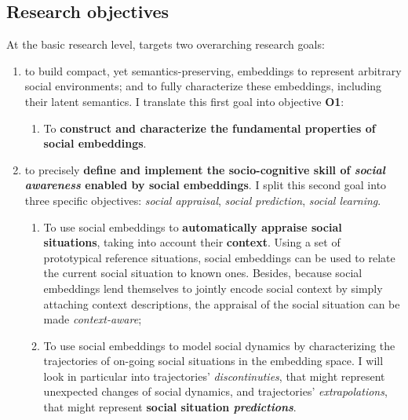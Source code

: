 \subsection{Research objectives}


At the basic research level, \project targets two overarching research goals:

\begin{enumerate}[label=\textbf{(\arabic*)}]
    \item to build compact, yet semantics-preserving, embeddings to represent
arbitrary social environments; and to fully characterize these embeddings,
including their latent semantics. I translate this first goal into objective
{\bf O1}:

\begin{enumerate}[label=\textbf{O\arabic*}]
    \item \label{O1} To \textbf{construct and characterize the fundamental
properties of social embeddings}.
\end{enumerate}

    \item to precisely \textbf{define and implement the socio-cognitive skill of
        \emph{social awareness} enabled by social embeddings}. I split this
        second goal into three specific objectives: \emph{social appraisal},
        \emph{social prediction}, \emph{social learning}.

\begin{enumerate}[label=\textbf{O2.\arabic*}]
    \item \label{O2.1} To use social embeddings to \textbf{automatically appraise
        social situations}, taking into account their \textbf{context}. Using
        a set of prototypical reference situations, social embeddings
        can be used to relate the current social situation to known ones.
        Besides, because social embeddings lend themselves to jointly encode
        social context by simply attaching context descriptions, the appraisal
        of the social situation can be made \emph{context-aware};

    \item \label{O2.2} To use social embeddings to model social dynamics
        by characterizing the trajectories of on-going social situations in the
        embedding space. I will look in particular into trajectories'
        \emph{discontinuties}, that might represent unexpected changes of social
        dynamics, and trajectories' \emph{extrapolations}, that might represent
        \textbf{social situation \emph{predictions}}.


\end{enumerate}
\end{enumerate}
